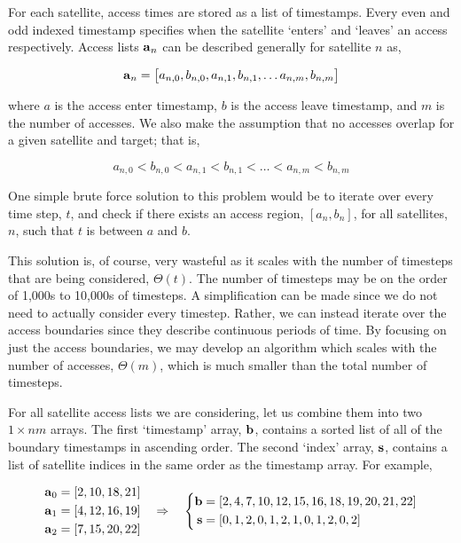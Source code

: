 For each satellite, access times are stored as a list of timestamps. Every even
and odd indexed timestamp specifies when the satellite `enters' and `leaves' an
access respectively. Access lists $\bm{\mathrm{a}}_{n}$ can be described generally for
satellite $n$ as,

\begin{equation}\label{eq:access-list} 
    \bm{\mathrm{a}}_{n} = \left[ a_{n,0}, b_{n,0}, a_{n,1}, b_{n,1}, \ldots a_{n,m}, b_{n,m} \right]
\end{equation}


where $a$ is the access enter timestamp, $b$ is the access leave timestamp, and
$m$ is the number of accesses. We also make the assumption that no accesses
overlap for a given satellite and target; that is,

\begin{equation}\label{eq:access-list-constraint}
    a_{n,0} < b_{n,0} < a_{n,1} < b_{n,1} < \ldots < a_{n,m} < b_{n,m}
\end{equation}

One simple brute force solution to this problem would be to iterate over every
time step, $t$, and check if there exists an access region, $[a_n,b_n]$, for all
satellites, $n$, such that $t$ is between $a$ and $b$.

This solution is, of course, very wasteful as it scales with the number of
timesteps that are being considered, $\Theta(t)$. The number of timesteps may
be on the order of 1,000s to 10,000s of timesteps. A simplification can be made
since we do not need to actually consider every timestep. Rather, we can
instead iterate over the access boundaries since they describe continuous
periods of time. By focusing on just the access boundaries, we may develop an
algorithm which scales with the number of accesses, $\Theta(m)$, which is much
smaller than the total number of timesteps.

For all satellite access lists we are considering, let us combine them into two
$1\times nm$ arrays. The first `timestamp' array, $\bm{\mathrm{b}}$, contains a sorted
list of all of the boundary timestamps in ascending order. The second `index'
array, $\bm{\mathrm{s}}$, contains a list of satellite indices in the same order as the
timestamp array. For example,

\begin{equation*}
    \begin{aligned} 
	\bm{\mathrm{a}}_{0} &= \left[ 2, 10, 18, 21  \right] \\
	\bm{\mathrm{a}}_{1} &= \left[ 4, 12, 16, 19  \right] \\
	\bm{\mathrm{a}}_{2} &= \left[ 7, 15, 20, 22  \right] \\
    \end{aligned}
    \quad \Rightarrow \quad
    \left \{ 
	\begin{aligned}
	    \bm{\mathrm{b}} &= [ 2 , 4 , 7 , 10 , 12 , 15 , 16 , 18 , 19 , 20 , 21 , 22  ] \\
	    \bm{\mathrm{s}} &= [ 0 , 1 , 2 , 0 , 1 , 2 , 1 , 0 , 1 , 2 , 0 , 2  ]
	\end{aligned}
    \right.
\end{equation*}

